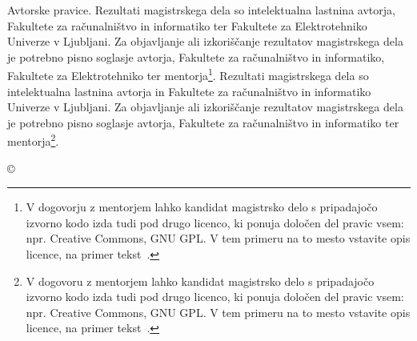 \thispagestyle{empty}
\vspace*{\fill}
{\noindent\footnotesize
{\sc Avtorske pravice}. 
\ifPROGRAMMM
    Rezultati magistrskega dela so intelektualna lastnina avtorja, Fakultete za ra\-ču\-nal\-niš\-tvo in informatiko ter Fakultete za Elektrotehniko Univerze v Ljubljani. Za objavljanje ali izkoriščanje rezultatov ma\-gi\-str\-ske\-ga dela je potrebno pisno soglasje avtorja, Fakultete za ra\-ču\-nal\-niš\-tvo in informatiko, Fakultete za Elektrotehniko ter mentorja\footnote{V dogovorju z mentorjem lahko kandidat magistrsko delo s pripadajočo izvorno kodo izda tudi pod drugo licenco, ki ponuja določen del pravic vsem: npr. Creative Commons, GNU GPL. V tem primeru na to mesto vstavite opis licence, na primer tekst~\cite{licence}.}.
\else
    Rezultati magistrskega dela so intelektualna lastnina avtorja in Fakultete za ra\-ču\-nal\-niš\-tvo in informatiko Univerze v Ljubljani. Za objavljanje ali izkoriščanje rezultatov ma\-gi\-str\-ske\-ga dela je potrebno pisno soglasje avtorja, Fakultete za ra\-ču\-nal\-niš\-tvo in informatiko ter mentorja\footnote{V dogovoru z mentorjem lahko kandidat magistrsko delo s pripadajočo izvorno kodo izda tudi pod drugo licenco, ki ponuja določen del pravic vsem: npr. Creative Commons, GNU GPL. V tem primeru na to mesto vstavite opis licence, na primer tekst~\cite{licence}.}.
\fi    
}
\begin{center}
{\footnotesize{\sc \copyright \myyear\ \tauthor}}
\end{center} 
